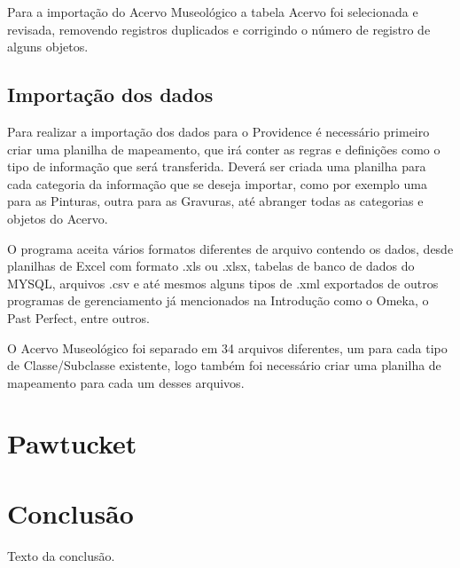 \documentclass[a4paper,12pt,oneside,onecolumn,final,fleqn]{repUERJ}
\begin{document}
Para a importação do Acervo Museológico a tabela Acervo foi selecionada e revisada, removendo registros duplicados e corrigindo o número de registro de alguns objetos.

\section{Importação dos dados}

Para realizar a importação dos dados para o Providence é necessário primeiro criar uma planilha de mapeamento, que irá conter as regras e definições como o tipo de informação que será transferida. Deverá ser criada uma planilha para cada categoria da informação que se deseja importar, como por exemplo uma para as Pinturas, outra para as Gravuras, até abranger todas as categorias e objetos do Acervo.

O programa aceita vários formatos diferentes de arquivo contendo os dados, desde planilhas de Excel com formato .xls ou .xlsx, tabelas de banco de dados do MYSQL, arquivos .csv e até mesmos alguns tipos de .xml exportados de outros programas de gerenciamento já mencionados na Introdução como o Omeka, o Past Perfect, entre outros.

O Acervo Museológico foi separado em 34 arquivos diferentes, um para cada tipo de Classe/Subclasse existente, logo também foi necessário criar uma planilha de mapeamento para cada um desses arquivos.



\chapter{Pawtucket}

\chapter*{Conclusão}

Texto da conclusão.


\backmatter %
\end{document}
